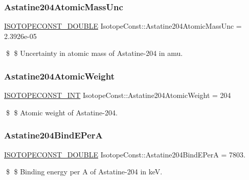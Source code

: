 \subsubsection{\texorpdfstring{Astatine204\+Atomic\+Mass\+Unc}{Astatine204AtomicMassUnc}}
{\footnotesize\ttfamily \mbox{\hyperlink{group___isotope_const-_macros_ga8f45a7272ce02c0b4c65c44636ed719a}{I\+S\+O\+T\+O\+P\+E\+C\+O\+N\+S\+T\+\_\+\+D\+O\+U\+B\+LE}} Isotope\+Const\+::\+Astatine204\+Atomic\+Mass\+Unc = 2.\+3926e-\/05}

\$ \$ Uncertainty in atomic mass of Astatine-\/204 in amu. \mbox{\label{group___isotope_const-_astatine-_at204_gab173ac6099c2abcbdf8fabdab9ec543c}} 
\subsubsection{\texorpdfstring{Astatine204\+Atomic\+Weight}{Astatine204AtomicWeight}}
{\footnotesize\ttfamily \mbox{\hyperlink{group___isotope_const-_macros_ga5f18360b3e99483a35c32d789e62621c}{I\+S\+O\+T\+O\+P\+E\+C\+O\+N\+S\+T\+\_\+\+I\+NT}} Isotope\+Const\+::\+Astatine204\+Atomic\+Weight = 204}

\$ \$ Atomic weight of Astatine-\/204. \mbox{\label{group___isotope_const-_astatine-_at204_ga1d4706c94c43905e5d2da7e2fbdf1ae6}} 
\subsubsection{\texorpdfstring{Astatine204\+Bind\+E\+PerA}{Astatine204BindEPerA}}
{\footnotesize\ttfamily \mbox{\hyperlink{group___isotope_const-_macros_ga8f45a7272ce02c0b4c65c44636ed719a}{I\+S\+O\+T\+O\+P\+E\+C\+O\+N\+S\+T\+\_\+\+D\+O\+U\+B\+LE}} Isotope\+Const\+::\+Astatine204\+Bind\+E\+PerA = 7803.}

\$ \$ Binding energy per A of Astatine-\/204 in keV. \mbox{\label{group___isotope_const-_astatine-_at204_ga6f5a30f20af9b787fd4949875bf491b0}} 
